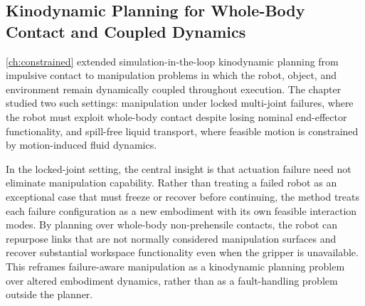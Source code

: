 
\subsection{Kinodynamic Planning for Whole-Body Contact and Coupled Dynamics}
\label{sec:discussion:constrained}

\cref{ch:constrained} extended simulation-in-the-loop kinodynamic planning from impulsive contact to manipulation problems in which the robot, object, and environment remain dynamically coupled throughout execution.
The chapter studied two such settings: manipulation under locked multi-joint failures, where the robot must exploit whole-body contact despite losing nominal end-effector functionality, and spill-free liquid transport, where feasible motion is constrained by motion-induced fluid dynamics.

In the locked-joint setting, the central insight is that actuation failure need not eliminate manipulation capability.
Rather than treating a failed robot as an exceptional case that must freeze or recover before continuing, the method treats each failure configuration as a new embodiment with its own feasible interaction modes.
By planning over whole-body non-prehensile contacts, the robot can repurpose links that are not normally considered manipulation surfaces and recover substantial workspace functionality even when the gripper is unavailable.
This reframes failure-aware manipulation as a kinodynamic planning problem over altered embodiment dynamics, rather than as a fault-handling problem outside the planner.

